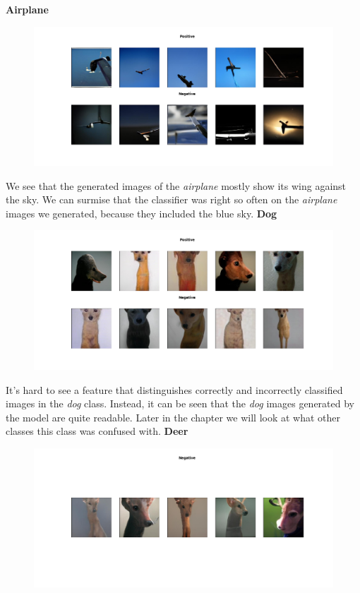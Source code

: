 \documentclass[12pt,a4paper,openany]{book}
\begin{document}
\noindent \textbf{Airplane}
\begin{figure}[ht!]
    \centering
    \includegraphics[scale=0.45]{figs/cifar10_examples/airplane.png}
\end{figure} 
\newline
\noindent We see that the generated images of the \textit{airplane} mostly show its wing against the sky. We can surmise that the classifier was right so often on the \textit{airplane} images we generated, because they included the blue sky.
\newpage
\noindent \textbf{Dog} \\
\begin{figure}[ht!]
    \centering
    \includegraphics[scale=0.45]{figs/cifar10_examples/dog.png}
\end{figure}
\newline It's hard to see a feature that distinguishes correctly and incorrectly classified images in the \textit{dog} class. Instead, it can be seen that the \textit{dog} images generated by the model are quite readable. Later in the chapter we will look at what other classes this class was confused with.
\newline
\newline
\noindent \textbf{Deer} \\
\begin{figure}[ht!]
    \centering
    \includegraphics[scale=0.45]{figs/cifar10_examples/deer.png}
\end{figure}
\end{document}
